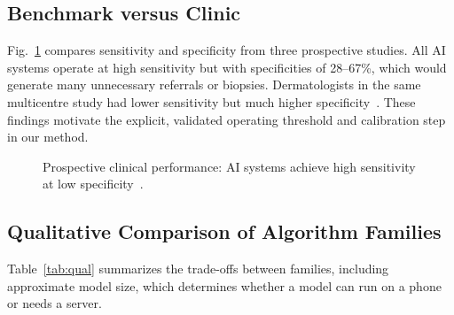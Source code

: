 \subsection{Benchmark versus Clinic}
Fig.~\ref{fig:clinic} compares sensitivity and specificity from three
prospective studies. All AI systems operate at high sensitivity but
with specificities of 28--67\%, which would generate many unnecessary
referrals or biopsies. Dermatologists in the same multicentre study had
lower sensitivity but much higher specificity~\cite{heinlein2024}. These
findings motivate the explicit, validated operating threshold and
calibration step in our method.

\begin{figure}[t]
\centering
{}
\caption{Prospective clinical performance: AI systems achieve high
sensitivity at low specificity~\cite{marchetti2023,marsden2023,heinlein2024}.}
\label{fig:clinic}
\end{figure}

\subsection{Qualitative Comparison of Algorithm Families}
Table~\ref{tab:qual} summarizes the trade-offs between families,
including approximate model size, which determines whether a model can
run on a phone or needs a server.

